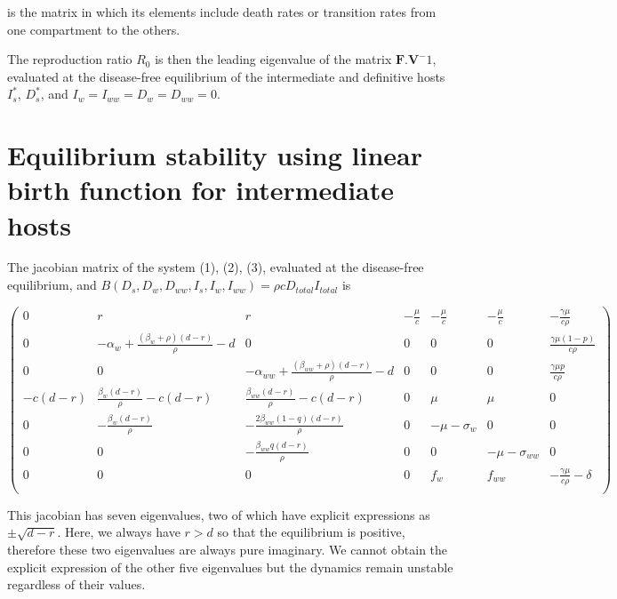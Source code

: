 \documentclass[11pt]{article}
\begin{document}
is the matrix in which its elements include death rates or transition rates from one compartment to the others.

The reproduction ratio $R_0$ is then the leading eigenvalue of the matrix $\mathbf{F}.\mathbf{V}^-1$, evaluated at the disease-free equilibrium of the intermediate and definitive hosts $I_s^*$, $D_s^*$, and $I_w = I_{ww} = D_w = D_{ww} = 0$.

\section*{Equilibrium stability using linear birth function for intermediate hosts}

The jacobian matrix of the system (1), (2), (3), evaluated at the disease-free equilibrium, and $B(D_s, D_w, D_{ww}, I_s, I_w, I_{ww}) = \rho c D_{total} I_{total}$ is

\[
\begin{pmatrix}
0 & r & r & -\frac{\mu}{c} & -\frac{\mu }{c} & -\frac{\mu }{c} & -\frac{\gamma  \mu }{c \rho } \\
0 & -\alpha_w + \frac{(\beta_w + \rho ) (d-r)}{\rho } - d & 0 & 0 & 0 & 0 & \frac{\gamma  \mu  (1-p)}{c \rho } \\
0 & 0 & -\alpha_{ww} + \frac{(\beta_{ww} + \rho ) (d-r)}{\rho } - d & 0 & 0 & 0 & \frac{\gamma  \mu  p}{c \rho } \\
-c (d-r) & \frac{\beta_w (d-r)}{\rho } - c (d-r) & \frac{\beta_{ww} (d-r)}{\rho }-c (d-r) & 0 & \mu  & \mu  & 0 \\
0 & -\frac{\beta_w (d-r)}{\rho } & -\frac{2 \beta_{ww} (1-q) (d-r)}{\rho } & 0 & -\mu - \sigma_w & 0 & 0 \\
 0 & 0 & -\frac{\beta_{ww} q (d-r)}{\rho } & 0 & 0 & -\mu - \sigma_{ww} & 0 \\
 0 & 0 & 0 & 0 & f_w & f_{ww} & -\frac{\gamma  \mu }{c \rho } - \delta  \\
\end{pmatrix}
\]

This jacobian has seven eigenvalues, two of which have explicit expressions as $\pm \sqrt{d - r}$. Here, we always have $r > d$ so that the equilibrium is positive, therefore these two eigenvalues are always pure imaginary. We cannot obtain the explicit expression of the other five eigenvalues but the dynamics remain unstable regardless of their values.
\end{document}
